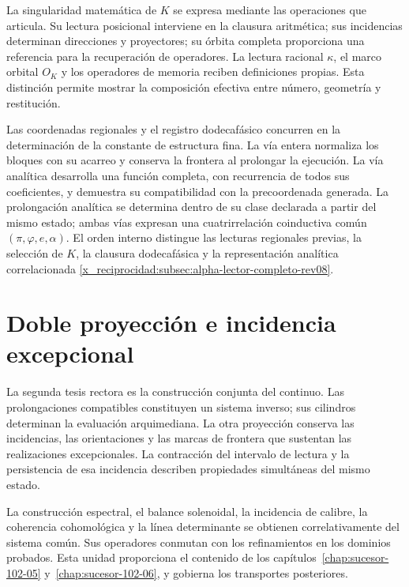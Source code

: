 La singularidad matemática de \(K\) se expresa mediante las operaciones
que articula. Su lectura posicional interviene en la clausura
aritmética; sus incidencias determinan direcciones y proyectores; su
órbita completa proporciona una referencia para la recuperación de
operadores. La lectura racional \(\kappa\), el marco orbital \(O_K\)
y los operadores de memoria reciben definiciones propias. Esta
distinción permite mostrar la composición efectiva entre número,
geometría y restitución.

Las coordenadas regionales y el registro dodecafásico concurren en
la determinación de la constante de estructura fina. La vía entera
normaliza los bloques con su acarreo y conserva la frontera al prolongar
la ejecución. La vía analítica desarrolla una función completa,
con recurrencia de todos sus coeficientes, y demuestra su compatibilidad
con la precoordenada generada. La prolongación analítica se determina
dentro de su clase declarada a partir del mismo estado; ambas vías
expresan una cuatrirrelación coinductiva común
\((\pi,\varphi,e,\alpha)\). El orden interno distingue las lecturas
regionales previas, la selección de \(K\), la clausura dodecafásica
y la representación analítica correlacionada
\ref{x_reciprocidad:subsec:alpha-lector-completo-rev08}.

\section*{Doble proyección e incidencia excepcional}

La segunda tesis rectora es la construcción conjunta del continuo.
Las prolongaciones compatibles constituyen un sistema inverso; sus
cilindros determinan la evaluación arquimediana. La otra proyección
conserva las incidencias, las orientaciones y las marcas de frontera
que sustentan las realizaciones excepcionales. La contracción del
intervalo de lectura y la persistencia de esa incidencia describen
propiedades simultáneas del mismo estado.

La construcción espectral, el balance solenoidal, la incidencia de
calibre, la coherencia cohomológica y la línea determinante se obtienen
correlativamente del sistema común. Sus operadores conmutan con los
refinamientos en los dominios probados. Esta unidad proporciona el
contenido de los capítulos~\ref{chap:sucesor-102-05}
y~\ref{chap:sucesor-102-06}, y gobierna los transportes posteriores.

